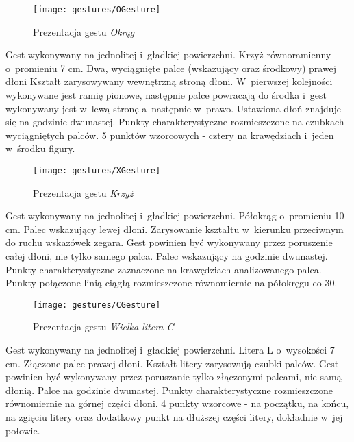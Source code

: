        \begin{figure}[!ht]
          \centering
          \texttt{[image: gestures/OGesture]}
          \caption[Prezentacja gestu Okrąg]
                  {Prezentacja gestu \textit{Okrąg}}
          \label{fig:OGesture}
        \end{figure}

      \newpage
             {Gest wykonywany na jednolitej i~gładkiej powierzchni.}
             {Krzyż równoramienny o~promieniu 7 cm.}
             {Dwa, wyciągnięte palce (wskazujący oraz środkowy) prawej dłoni}
             {Kształt zarysowywany wewnętrzną stroną dłoni.}
             {W~pierwszej kolejności wykonywane jest ramię pionowe, następnie palce powracają do środka i~gest wykonywany jest w~lewą stronę a~następnie w~prawo.}
             {Ustawiona dłoń znajduje się na godzinie dwunastej.}
             {Punkty charakterystyczne rozmieszczone na czubkach wyciągniętych palców.}
             {5 punktów wzorcowych - cztery na krawędziach i~jeden w~środku figury.}

        \begin{figure}[!ht]
          \centering
          \texttt{[image: gestures/XGesture]}
          \caption[Prezentacja gestu Krzyż]
                  {Prezentacja gestu \textit{Krzyż}}
          \label{fig:XGesture}
        \end{figure}

      \newpage
             {Gest wykonywany na jednolitej i~gładkiej powierzchni.}
             {Półokrąg o~promieniu 10 cm.}
             {Palec wskazujący lewej dłoni.}
             {Zarysowanie kształtu w~kierunku przeciwnym do ruchu wskazówek zegara.}
             {Gest powinien być wykonywany przez poruszenie całej dłoni, nie tylko samego palca.}
             {Palec wskazujący na godzinie dwunastej.}
             {Punkty charakterystyczne zaznaczone na krawędziach analizowanego palca.}
             {Punkty połączone linią ciągłą rozmieszczone równomiernie na półokręgu co 30\degree.}

        \begin{figure}[!ht]
          \centering
          \texttt{[image: gestures/CGesture]}
          \caption[Prezentacja gestu Wielka litera C]
                  {Prezentacja gestu \textit{Wielka litera C}}
          \label{fig:CGesture}
        \end{figure}

      \newpage
             {Gest wykonywany na jednolitej i~gładkiej powierzchni.}
             {Litera L o~wysokości 7 cm.}
             {Złączone palce prawej dłoni.}
             {Kształt litery zarysowują czubki palców.}
             {Gest powinien być wykonywany przez poruszanie tylko złączonymi palcami, nie samą dłonią.}
             {Palce na godzinie dwunastej.}
             {Punkty charakterystyczne rozmieszczone równomiernie na górnej części dłoni.}
             {4 punkty wzorcowe - na początku, na końcu, na zgięciu litery oraz dodatkowy punkt na dłuższej części litery, dokładnie w~jej połowie.}

